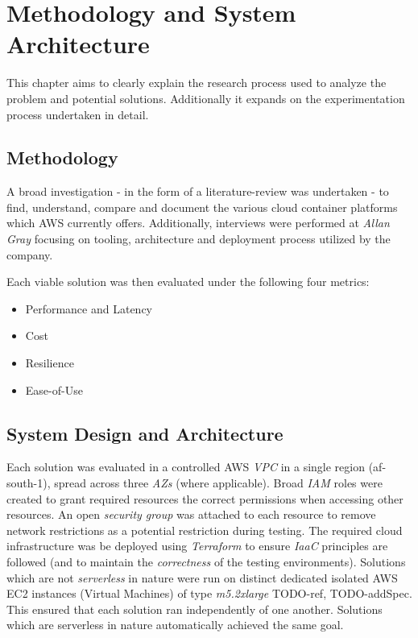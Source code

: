 \part{Methodology and System Architecture}

This chapter aims to clearly explain the research process used to analyze the problem and potential solutions.
Additionally it expands on the experimentation process undertaken in detail.

\chapter{Methodology}
A broad investigation - in the form of a literature-review was undertaken - to find, understand, compare and document the various cloud container platforms which AWS currently offers.
Additionally, interviews were performed at \emph{Allan Gray} focusing on tooling, architecture and deployment process utilized by the company.

\noindent \newline Each viable solution was then evaluated under the following four metrics:
\begin{itemize}
  \item Performance and Latency
  \item Cost
  \item Resilience
  \item Ease-of-Use
\end{itemize}

\chapter{System Design and Architecture}

Each solution was evaluated in a controlled AWS \emph{VPC} in a single region (af-south-1), spread across three \emph{AZs} (where applicable).
Broad \textit{IAM} roles were created to grant required resources the correct permissions when accessing other resources.
An open \textit{security group} was attached to each resource to remove network restrictions as a potential restriction during testing.
The required cloud infrastructure was be deployed using \emph{Terraform} to ensure \emph{IaaC} principles are followed (and to maintain the \emph{correctness} of the testing environments).
Solutions which are not \emph{serverless} in nature were run on distinct dedicated isolated AWS EC2 instances (Virtual Machines) of type \emph{m5.2xlarge} TODO-ref, TODO-addSpec. This ensured that each solution ran independently of one another.
Solutions which are serverless in nature automatically achieved the same goal.

